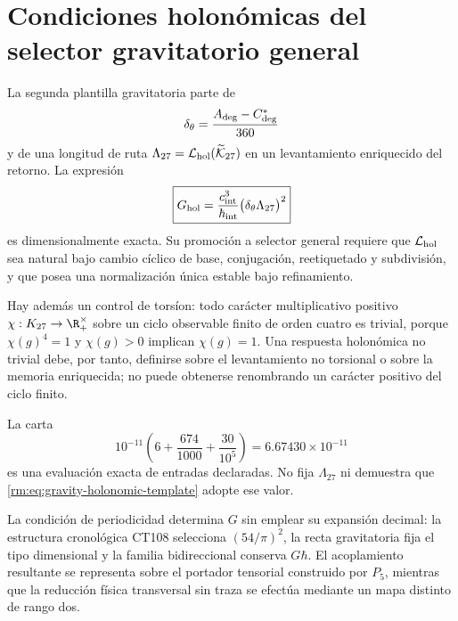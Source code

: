 \section{Condiciones holon\'omicas del selector gravitatorio general}

La segunda plantilla gravitatoria parte de
\begin{equation}
\label{rm:eq:gravity-delta-theta}
\delta_\theta
=\frac{A_{\rm deg}-C^*_{\rm deg}}{360}
\end{equation}
y de una longitud de ruta
\(\Lambda_{27}=\mathcal L_{\rm hol}(\widetilde{\mathcal K}_{27})\)
en un levantamiento enriquecido del retorno. La expresi\'on
\begin{equation}
\label{rm:eq:gravity-holonomic-template}
\boxed{
G_{\rm hol}
=\frac{c_{\rm int}^3}{\hbar_{\rm int}}
\bigl(\delta_\theta\Lambda_{27}\bigr)^2}
\end{equation}
es dimensionalmente exacta. Su promoci\'on a selector general requiere que
\(\mathcal L_{\rm hol}\) sea natural bajo cambio c\'iclico de base,
conjugaci\'on, reetiquetado y subdivisi\'on, y que posea una normalizaci\'on
\'unica estable bajo refinamiento.

Hay adem\'as un control de tors\'ion: todo car\'acter multiplicativo positivo
\(\chi:K_{27}\to\R_+^\times\) sobre un ciclo observable finito de orden
cuatro es trivial, porque \(\chi(g)^4=1\) y \(\chi(g)>0\) implican
\(\chi(g)=1\). Una respuesta holon\'omica no trivial debe, por tanto,
definirse sobre el levantamiento no torsional o sobre la memoria
enriquecida; no puede
obtenerse renombrando un car\'acter positivo del ciclo finito.

La carta
\begin{equation}
\label{rm:eq:gravity-decimal-chart}
10^{-11}\left(6+\frac{674}{1000}+\frac{30}{10^5}\right)
=6.67430\times10^{-11}
\end{equation}
es una evaluaci\'on exacta de entradas declaradas. No fija
\(\Lambda_{27}\) ni demuestra que \cref{rm:eq:gravity-holonomic-template}
adopte ese valor.

\begin{keyresult}
La condici\'on de periodicidad determina \(G\) sin emplear su expansi\'on
decimal: la estructura cronol\'ogica CT108 selecciona \((54/\pi)^2\), la
recta gravitatoria fija el tipo dimensional y la familia bidireccional
conserva \(G\hbar\). El acoplamiento resultante se representa sobre el
portador tensorial construido por \(P_5\), mientras que la reducci\'on
f\'isica transversal sin traza se efect\'ua mediante un mapa distinto de
rango dos.
\end{keyresult}

